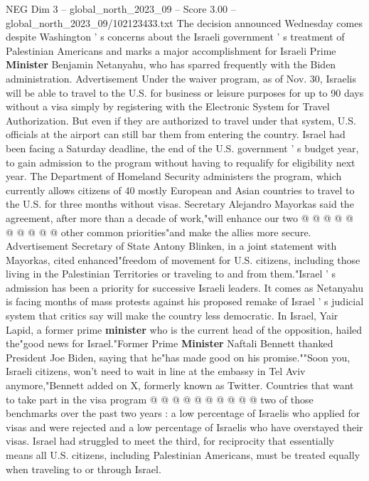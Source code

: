\begin{textsample}{NEG Dim 3 – global\_north\_2023\_09 – Score 3.00 – global\_north\_2023\_09/102123433.txt}  \label{ex:f3_neg_415}
The decision announced Wednesday comes despite Washington ' s concerns about the Israeli government ' s treatment of Palestinian Americans and marks a major accomplishment for Israeli Prime \textbf{Minister} Benjamin Netanyahu, who has sparred frequently with the Biden administration.
Advertisement Under the waiver program, as of Nov. 30, Israelis will be able to travel to the U.S. for business or leisure purposes for up to 90 days without a visa simply by registering with the Electronic System for Travel Authorization.
But even if they are authorized to travel under that system, U.S. officials at the airport can still bar them from entering the country.
Israel had been facing a Saturday deadline, the end of the U.S. government ' s budget year, to gain admission to the program without having to requalify for eligibility next year.
The Department of Homeland Security administers the program, which currently allows citizens of 40 mostly European and Asian countries to travel to the U.S. for three months without visas.
Secretary Alejandro Mayorkas said the agreement, after more than a decade of work,"will enhance our two @ @ @ @ @ @ @ @ @ @ other common priorities"and make the allies more secure.
Advertisement Secretary of State Antony Blinken, in a joint statement with Mayorkas, cited enhanced"freedom of movement for U.S. citizens, including those living in the Palestinian Territories or traveling to and from them."Israel ' s admission has been a priority for successive Israeli leaders.
It comes as Netanyahu is facing months of mass protests against his proposed remake of Israel ' s judicial system that critics say will make the country less democratic.
In Israel, Yair Lapid, a former prime \textbf{minister} who is the current head of the opposition, hailed the"good news for Israel."Former Prime \textbf{Minister} Naftali Bennett thanked President Joe Biden, saying that he"has made good on his promise.""Soon you, Israeli citizens, won't need to wait in line at the embassy in Tel Aviv anymore,"Bennett added on X, formerly known as Twitter.
Countries that want to take part in the visa program @ @ @ @ @ @ @ @ @ @ two of those benchmarks over the past two years : a low percentage of Israelis who applied for visas and were rejected and a low percentage of Israelis who have overstayed their visas.
Israel had struggled to meet the third, for reciprocity that essentially means all U.S. citizens, including Palestinian Americans, must be treated equally when traveling to or through Israel.

\end{textsample}
